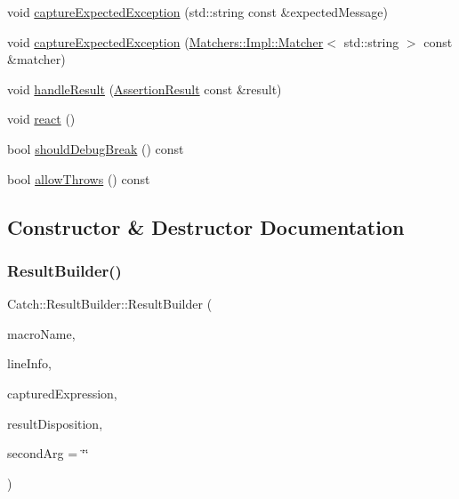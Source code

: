 \begin{DoxyCompactItemize}
void \hyperlink{class_catch_1_1_result_builder_a9ac96f6220c8dd8e4feee725c6228d77}{capture\+Expected\+Exception} (std\+::string const \&expected\+Message)
\item 
void \hyperlink{class_catch_1_1_result_builder_a7d443d632eaeabe2cb36218b8dcb7400}{capture\+Expected\+Exception} (\hyperlink{struct_catch_1_1_matchers_1_1_impl_1_1_matcher}{Matchers\+::\+Impl\+::\+Matcher}$<$ std\+::string $>$ const \&matcher)
\item 
void \hyperlink{class_catch_1_1_result_builder_ad8bb17e4ac590b75bf8630d8f3502f4e}{handle\+Result} (\hyperlink{class_catch_1_1_assertion_result}{Assertion\+Result} const \&result)
\item 
void \hyperlink{class_catch_1_1_result_builder_a3085cdc46533d45bed6f652a2ac295c0}{react} ()
\item 
bool \hyperlink{class_catch_1_1_result_builder_a6f2b0dbcc6cc5e0a500ac45f2534e3e7}{should\+Debug\+Break} () const
\item 
bool \hyperlink{class_catch_1_1_result_builder_a0428fd78ab9e8e6f1aca6855f20fc715}{allow\+Throws} () const
\end{DoxyCompactItemize}


\subsection{Constructor \& Destructor Documentation}
\hypertarget{class_catch_1_1_result_builder_a8579c3056f64f9324cf1181532828376}{}\label{class_catch_1_1_result_builder_a8579c3056f64f9324cf1181532828376} 
\subsubsection{\texorpdfstring{Result\+Builder()}{ResultBuilder()}}
{\footnotesize\ttfamily Catch\+::\+Result\+Builder\+::\+Result\+Builder (\begin{DoxyParamCaption}\item[{char const $\ast$}]{macro\+Name,  }\item[{\hyperlink{struct_catch_1_1_source_line_info}{Source\+Line\+Info} const \&}]{line\+Info,  }\item[{char const $\ast$}]{captured\+Expression,  }\item[{\hyperlink{struct_catch_1_1_result_disposition_a3396cad6e2259af326b3aae93e23e9d8}{Result\+Disposition\+::\+Flags}}]{result\+Disposition,  }\item[{char const $\ast$}]{second\+Arg = {\ttfamily \char`\"{}\char`\"{}} }\end{DoxyParamCaption})}




